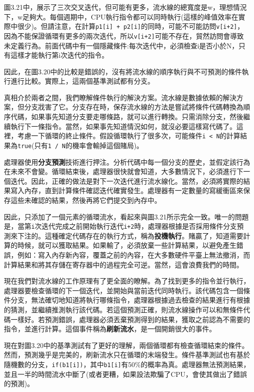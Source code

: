 圖3.21中，展示了三次交叉迭代，但可能有更多，流水線的總寬度是w，理想情況下，w足夠大。每個週期中，CPU執行指令都可以同時執行(這樣的峰值效率在實際中很少)。但請注意，在計算\texttt{p1[i] + p2[i]}的同時，可能不可能訪問\texttt{v[i+2]}，因為不能保證循環有更多的兩次迭代，所以\texttt{v[i+2]}可能不存在，貿然訪問會導致未定義行為。前面代碼中有一個隱藏條件:每次迭代中，必須檢查i是否小於N，只有這樣才能執行第i次迭代的指令。

因此，在圖3.20中的比較是錯誤的，沒有將流水線的順序執行與不可預測的條件執行進行比較。實際上，這兩個基準測試都有分支。

真相介於兩者之間，我們瞭解條件執行的解決方案。流水線是數據依賴的解決方案，但分支戕害了它。分支存在時，保存流水線的方法是嘗試將條件代碼轉換為順序代碼，如果事先知道分支要走哪條路，就可以進行轉換。只需消除分支，然後繼續執行下一條指令。當然，如果事先知道情況如何，就沒必要這樣寫代碼了。這裡，考慮一下循環的終止條件。假設循環執行了很多次，可能條件\texttt{i < N}的計算結果為\texttt{true}(只有\texttt{1 / N}的機率會輸掉這個賭局)。

處理器使用\textbf{分支預測}技術進行押注。分析代碼中每一個分支的歷史，並假定該行為在未來不會變。循環結束後，處理器很快就會知道，大多數情況下，必須進行下一個迭代。因此，正確的做法是對下一次迭代進行流水線化。當然，必須將實際的結果寫入內存，直到計算條件確認迭代確實發生。處理器有一定數量的寫緩衝區來保存這些未確認的結果，然後再將它們提交到內存中。

因此，只添加了一個元素的循環流水，看起來與圖3.21所示完全一致。唯一的問題是，當第\texttt{i}次迭代完成之前開始執行迭代\texttt{i+2}時，處理器根據是否採用條件分支預測來下注的。這種確定代碼存在的執行方式，稱為\textbf{投機執行}。賭贏了，知道需要計算的時候，就可以獲取結果。如果輸了，必須放棄一些計算結果，以避免產生錯誤，例如：寫入內存新內容，覆蓋之前的內容，在大多數硬件平臺上無法撤消，而計算結果和將其存儲在寄存器中的過程完全可逆。當然，這會浪費我們的時間。

現在我們對流水線的工作原理有了更全面的瞭解。為了找到更多的指令並行執行，處理器要檢查循環的下一個迭代，並開始與當前迭代同時執行。該代碼包含一個條件分支，無法確切地知道將執行哪條指令，處理器根據過去檢查的結果進行有根據的猜測，並繼續推測執行該代碼。若這個預測正確，則流水線操作可以和無條件代碼一樣好。若預測錯誤，處理器必須丟棄預測得到的結果，獲取之前認為不需要的指令，並進行計算。這個事件稱為\textbf{刷新流水}，是一個開銷很大的事件。

現在對圖3.20中的基準測試有了更好的理解，兩個循環都有檢查循環結束的條件。然而，預測幾乎是完美的，刷新流水只在循環的末端發生。條件基準測試也有基於隨機數的分支，\texttt{if(b1[i])}，其中\texttt{b1[i]}有50\%的概率為真。處理器無法預測結果，並且一半的時間流水中斷了(或者更糟，如果設法欺騙了CPU，會使其做出了錯誤的預測)。

